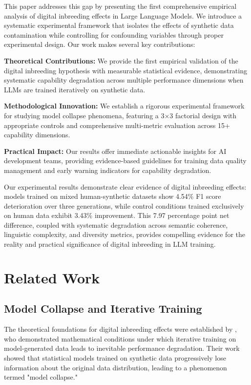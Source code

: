 \documentclass{article}
\begin{document}
This paper addresses this gap by presenting the first comprehensive empirical analysis of digital inbreeding effects in Large Language Models. We introduce a systematic experimental framework that isolates the effects of synthetic data contamination while controlling for confounding variables through proper experimental design. Our work makes several key contributions:

\textbf{Theoretical Contributions:} We provide the first empirical validation of the digital inbreeding hypothesis with measurable statistical evidence, demonstrating systematic capability degradation across multiple performance dimensions when LLMs are trained iteratively on synthetic data.

\textbf{Methodological Innovation:} We establish a rigorous experimental framework for studying model collapse phenomena, featuring a 3×3 factorial design with appropriate controls and comprehensive multi-metric evaluation across 15+ capability dimensions.

\textbf{Practical Impact:} Our results offer immediate actionable insights for AI development teams, providing evidence-based guidelines for training data quality management and early warning indicators for capability degradation.

Our experimental results demonstrate clear evidence of digital inbreeding effects: models trained on mixed human-synthetic datasets show 4.54\% F1 score deterioration over three generations, while control conditions trained exclusively on human data exhibit 3.43\% improvement. This 7.97 percentage point net difference, coupled with systematic degradation across semantic coherence, linguistic complexity, and diversity metrics, provides compelling evidence for the reality and practical significance of digital inbreeding in LLM training.

\section{Related Work}

\subsection{Model Collapse and Iterative Training}

The theoretical foundations for digital inbreeding effects were established by \cite{shumailov2024curse}, who demonstrated mathematical conditions under which iterative training on model-generated data leads to inevitable performance degradation. Their work showed that statistical models trained on synthetic data progressively lose information about the original data distribution, leading to a phenomenon termed "model collapse."
\end{document}
